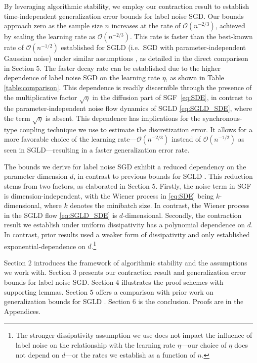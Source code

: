 \documentclass{article}
\begin{document}
By leveraging algorithmic stability, we employ our contraction result to establish time-independent generalization error bounds for label noise SGD. Our bounds approach zero as the sample size $n$ increases at the rate of $\mathcal{O}(n^{-2/3})$, achieved by scaling the learning rate as $\mathcal{O}(n^{-2/3})$. This rate is faster than the best-known rate of $\mathcal{O}(n^{-1/2})$ established for SGLD (i.e.\ SGD with parameter-independent Gaussian noise) under similar assumptions \citep{Farghly}, as detailed in the direct comparison in Section 5. The faster decay rate can be established due to the higher dependence of label noise SGD on the learning rate $\eta$, as shown in Table \ref{table:comparison}. This dependence is readily discernible through the presence of the multiplicative factor $\sqrt{\eta}$ in the diffusion part of SGF~\eqref{eq:SDE}, in contrast to the parameter-independent noise flow dynamics of SGLD \eqref{eq:SGLD_SDE}, where the term $\sqrt{\eta}$ is absent.
This dependence has implications for the synchronous-type coupling technique we use to estimate the discretization error. It allows for a more favorable choice of the learning rate---$\mathcal{O}(n^{-2/3})$ instead of $\mathcal{O}(n^{-1/2})$ as seen in SGLD---resulting in a faster generalization error rate.

The bounds we derive for label noise SGD exhibit a reduced dependency on the parameter dimension $d$, in contrast to previous bounds for SGLD \citep{Farghly}. This reduction stems from two factors, as elaborated in Section 5. 
Firstly, the noise term in SGF is dimension-independent, with the Wiener process in \eqref{eq:SDE} being $k$-dimensional, where $k$ denotes the minibatch size. In contrast, the Wiener process in the SGLD flow \eqref{eq:SGLD_SDE} is $d$-dimensional. Secondly, the contraction result we establish under uniform dissipativity has a polynomial dependence on $d$. In contrast, prior results used a weaker form of dissipativity and only established exponential-dependence on $d$.\footnote{The stronger dissipativity assumption we use does not impact the influence of label noise on the relationship with the learning rate $\eta$---our choice of $\eta$ does not depend on $d$---or the rates we establish as a function of $n$.}

Section 2 introduces the framework of algorithmic stability and the assumptions we work with. Section 3 presents our contraction result and generalization error bounds for label noise SGD. Section 4 illustrates the proof schemes with supporting lemmas. Section 5 offers a comparison with prior work on generalization bounds for SGLD \citep{Farghly}. Section 6 is the conclusion. Proofs are in the Appendices.
\end{document}
